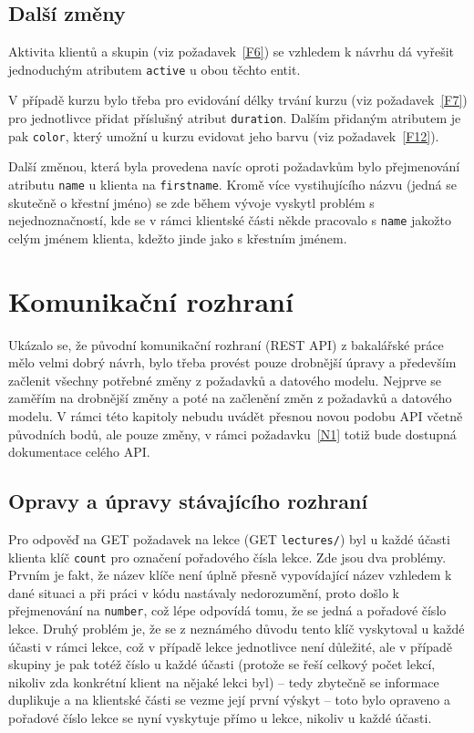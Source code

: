 \subsection{Další změny}

Aktivita klientů a skupin (viz požadavek~\ref{F6}) se vzhledem k návrhu dá vyřešit jednoduchým atributem \verb|active| u obou těchto entit.

V případě kurzu bylo třeba pro evidování délky trvání kurzu (viz požadavek~\ref{F7}) pro jednotlivce přidat příslušný atribut \verb|duration|. Dalším přidaným atributem je pak \verb|color|, který umožní u kurzu evidovat jeho barvu (viz požadavek~\ref{F12}).

Další změnou, která byla provedena navíc oproti požadavkům bylo přejmenování atributu \verb|name| u klienta na \verb|firstname|. Kromě více vystihujícího názvu (jedná se skutečně o křestní jméno) se zde během vývoje vyskytl problém s nejednoznačností, kde se v rámci klientské části někde pracovalo s \verb|name| jakožto celým jménem klienta, kdežto jinde jako s křestním jménem.

\section{Komunikační rozhraní}\label{sec:komunikacnirozhrani}

Ukázalo se, že původní komunikační rozhraní (REST API) z bakalářské práce mělo velmi dobrý návrh, bylo třeba provést pouze drobnější úpravy a především začlenit všechny potřebné změny z požadavků a datového modelu. Nejprve se zaměřím na drobnější změny a poté na začlenění změn z požadavků a datového modelu. V rámci této kapitoly nebudu uvádět přesnou novou podobu API včetně původních bodů, ale pouze změny, v rámci požadavku~\ref{N1} totiž bude dostupná dokumentace celého API.

\subsection{Opravy a úpravy stávajícího rozhraní}

Pro odpověď na GET požadavek na lekce (GET \verb|lectures/|) byl u každé účasti klienta klíč \verb|count| pro označení pořadového čísla lekce. Zde jsou dva problémy. Prvním je fakt, že název klíče není úplně přesně vypovídající název vzhledem k dané situaci a při práci v kódu nastávaly nedorozumění, proto došlo k přejmenování na \verb|number|, což lépe odpovídá tomu, že se jedná a pořadové číslo lekce. Druhý problém je, že se z neznámého důvodu tento klíč vyskytoval u každé účasti v rámci lekce, což v případě lekce jednotlivce není důležité, ale v případě skupiny je pak totéž číslo u každé účasti (protože se řeší celkový počet lekcí, nikoliv zda konkrétní klient na nějaké lekci byl) -- tedy zbytečně se informace duplikuje a na klientské části se vezme její první výskyt -- toto bylo opraveno a pořadové číslo lekce se nyní vyskytuje přímo u lekce, nikoliv u každé účasti.

